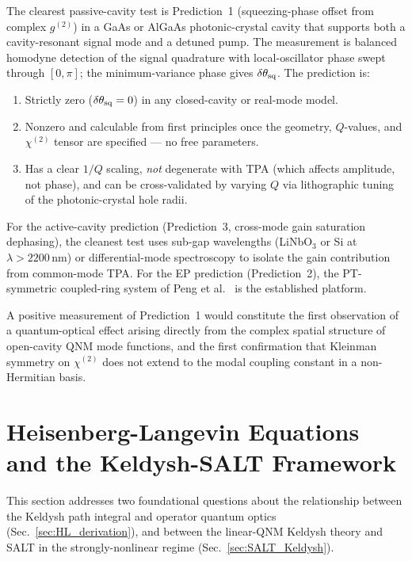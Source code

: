 \documentclass[12pt]{article}
\begin{document}
The clearest passive-cavity test is Prediction~1 (squeezing-phase
offset from complex $g^{(2)}$) in a GaAs or AlGaAs photonic-crystal
cavity that supports both a cavity-resonant signal mode and a
detuned pump.  The measurement is balanced homodyne detection of the
signal quadrature with local-oscillator phase swept through
$[0,\pi]$; the minimum-variance phase gives $\delta\theta_{\rm sq}$.
The prediction is:
\begin{enumerate}
  \item Strictly zero ($\delta\theta_{\rm sq}=0$) in any closed-cavity
    or real-mode model.
  \item Nonzero and calculable from first principles once the
    geometry, $Q$-values, and $\chi^{(2)}$ tensor are specified --- no
    free parameters.
  \item Has a clear $1/Q$ scaling, \emph{not} degenerate with TPA
    (which affects amplitude, not phase), and can be
    cross-validated by varying $Q$ via lithographic tuning of the
    photonic-crystal hole radii.
\end{enumerate}
For the active-cavity prediction (Prediction~3, cross-mode gain
saturation dephasing), the cleanest test uses sub-gap wavelengths
(LiNbO$_3$ or Si at $\lambda>2200\,\mathrm{nm}$) or differential-mode
spectroscopy to isolate the gain contribution from common-mode TPA.
For the EP prediction (Prediction~2), the PT-symmetric coupled-ring
system of Peng et al.\ \cite{Peng2014} is the established platform.

A positive measurement of Prediction~1 would constitute the first
observation of a quantum-optical effect arising directly from the
complex spatial structure of open-cavity QNM mode functions, and the
first confirmation that Kleinman symmetry on $\chi^{(2)}$ does not
extend to the modal coupling constant in a non-Hermitian basis.

\section{Heisenberg-Langevin Equations and the Keldysh-SALT Framework}
\label{sec:SALT_HL}

This section addresses two foundational questions about the relationship
between the Keldysh path integral and operator quantum optics
(Sec.~\ref{sec:HL_derivation}), and between the linear-QNM Keldysh theory
and SALT in the strongly-nonlinear regime
(Sec.~\ref{sec:SALT_Keldysh}).
\end{document}
